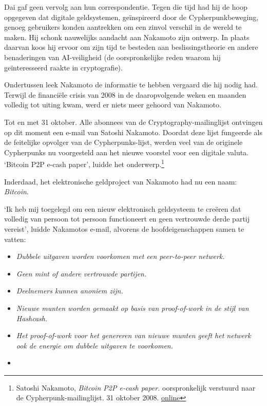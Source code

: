 \documentclass[
  a5paper,
  smalldemyvopaper,11pt,twoside,onecolumn,openright,extrafontsizes,
hidelinks]{memoir}
\begin{document}
Dai gaf geen vervolg aan hun correspondentie. Tegen die tijd had hij de
hoop opgegeven dat digitale geldsystemen, geïnspireerd door de
Cypherpunkbeweging, genoeg gebruikers konden aantrekken om een zinvol
verschil in de wereld te maken. Hij schonk nauwelijks aandacht aan
Nakamoto zijn ontwerp. In plaats daarvan koos hij ervoor om zijn tijd te
besteden aan beslissingstheorie en andere benaderingen van AI-veiligheid
(de oorspronkelijke reden waarom hij geïnteresseerd raakte in
cryptografie).

Ondertussen leek Nakamoto de informatie te hebben vergaard die hij nodig
had. Terwijl de financiële crisis van 2008 in de daaropvolgende weken en
maanden volledig tot uiting kwam, werd er niets meer gehoord van
Nakamoto.

Tot en met 31 oktober. Alle abonnees van de Cryptography-mailinglijst
ontvingen op dit moment een e-mail van Satoshi Nakamoto. Doordat deze
lijst fungeerde als de feitelijke opvolger van de Cypherpunks-lijst,
werden veel van de originele Cypherpunks nu voorgesteld aan het nieuwe
voorstel voor een digitale valuta. `Bitcoin P2P e-cash paper', luidde
het onderwerp.\footnote{Satoshi Nakamoto, \emph{Bitcoin P2P e-cash
  paper.} oorspronkelijk verstuurd naar de Cypherpunk-mailinglijst. 31
  oktober 2008.
  \href{https://www.metzdowd.com/pipermail/cryptography/2008-October/014810.html}{online}}

Inderdaad, het elektronische geldproject van Nakamoto had nu een naam:
\emph{Bitcoin}.

`Ik heb mij toegelegd om een nieuw elektronisch geldsysteem te creëren
dat volledig van persoon tot persoon functioneert en geen vertrouwde
derde partij vereist', luidde Nakamotos e-mail, alvorens de
hoofdeigenschappen samen te vatten:

\begin{itemize}
\item
  \emph{Dubbele uitgaven worden voorkomen met een peer-to-peer netwerk.}
\item
  \emph{Geen mint of andere vertrouwde partijen.}
\item
  \emph{Deelnemers kunnen anoniem zijn.}
\item
  \emph{Nieuwe munten worden gemaakt op basis van proof-of-work in de
  stijl van Hashcash.}
\item
  \emph{Het proof-of-work voor het genereren van nieuwe munten geeft het
  netwerk ook de energie om dubbele uitgaven te voorkomen.}
\item
\end{itemize}
\end{document}
